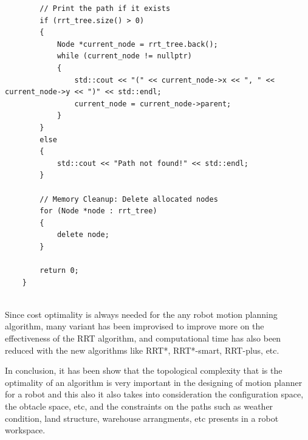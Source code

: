 \begin{lstlisting}
        // Print the path if it exists
        if (rrt_tree.size() > 0)
        {
            Node *current_node = rrt_tree.back();
            while (current_node != nullptr)
            {
                std::cout << "(" << current_node->x << ", " << current_node->y << ")" << std::endl;
                current_node = current_node->parent;
            }
        }
        else
        {
            std::cout << "Path not found!" << std::endl;
        }
    
        // Memory Cleanup: Delete allocated nodes
        for (Node *node : rrt_tree)
        {
            delete node;
        }
    
        return 0;
    }
    

\end{lstlisting}

Since cost optimality is always needed for the any robot motion planning algorithm, many variant has been improvised to improve more on the effectiveness of the RRT algorithm, and computational time has also been reduced with the new algorithms like RRT*, RRT*-smart, RRT-plus, etc.

In conclusion, it has been show that the topological complexity that is the optimality of an algorithm is very important in the designing of motion planner for a robot and this also it also takes into consideration the configuration space, the obtacle space, etc, and the constraints on the paths such as weather condition, land structure, warehouse arrangments, etc presents in a robot workspace.

